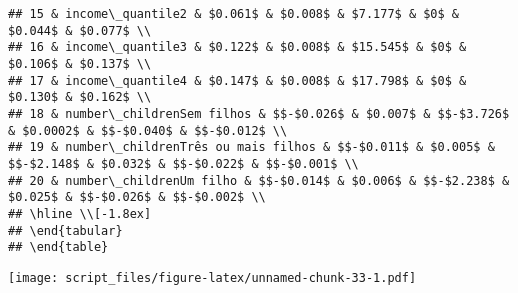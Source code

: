 \documentclass[
]{article}
\newenvironment{Shaded}{\begin{snugshade}}{\end{snugshade}}
\newcommand{\AttributeTok}[1]{\textcolor[rgb]{0.77,0.63,0.00}{#1}}
\newcommand{\CommentTok}[1]{\textcolor[rgb]{0.56,0.35,0.01}{\textit{#1}}}
\newcommand{\FunctionTok}[1]{\textcolor[rgb]{0.00,0.00,0.00}{#1}}
\newcommand{\NormalTok}[1]{#1}
\newcommand{\OtherTok}[1]{\textcolor[rgb]{0.56,0.35,0.01}{#1}}
\newcommand{\SpecialCharTok}[1]{\textcolor[rgb]{0.00,0.00,0.00}{#1}}
\newcommand{\StringTok}[1]{\textcolor[rgb]{0.31,0.60,0.02}{#1}}
\begin{document}
\begin{verbatim}
## 15 & income\_quantile2 & $0.061$ & $0.008$ & $7.177$ & $0$ & $0.044$ & $0.077$ \\ 
## 16 & income\_quantile3 & $0.122$ & $0.008$ & $15.545$ & $0$ & $0.106$ & $0.137$ \\ 
## 17 & income\_quantile4 & $0.147$ & $0.008$ & $17.798$ & $0$ & $0.130$ & $0.162$ \\ 
## 18 & number\_childrenSem filhos & $$-$0.026$ & $0.007$ & $$-$3.726$ & $0.0002$ & $$-$0.040$ & $$-$0.012$ \\ 
## 19 & number\_childrenTrês ou mais filhos & $$-$0.011$ & $0.005$ & $$-$2.148$ & $0.032$ & $$-$0.022$ & $$-$0.001$ \\ 
## 20 & number\_childrenUm filho & $$-$0.014$ & $0.006$ & $$-$2.238$ & $0.025$ & $$-$0.026$ & $$-$0.002$ \\ 
## \hline \\[-1.8ex] 
## \end{tabular} 
## \end{table}
\end{verbatim}

\begin{Shaded}
\end{Shaded}

\texttt{[image: script\_files/figure-latex/unnamed-chunk-33-1.pdf]}

\begin{Shaded}
\end{Shaded}
\end{document}
